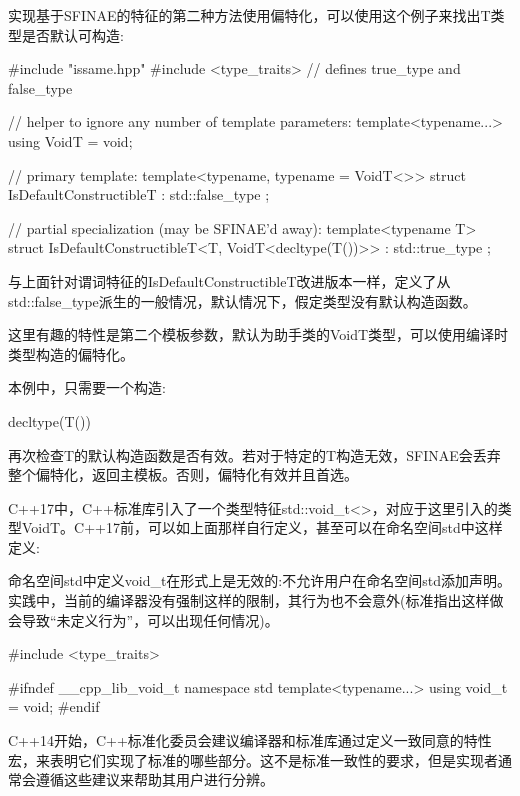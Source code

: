 实现基于SFINAE的特征的第二种方法使用偏特化，可以使用这个例子来找出T类型是否默认可构造:

\begin{cpp}
#include "issame.hpp"
#include <type_traits> // defines true_type and false_type

// helper to ignore any number of template parameters:
template<typename...> using VoidT = void;

// primary template:
template<typename, typename = VoidT<>>
struct IsDefaultConstructibleT : std::false_type
{
};

// partial specialization (may be SFINAE’d away):
template<typename T>
struct IsDefaultConstructibleT<T, VoidT<decltype(T())>> : std::true_type
{
};
\end{cpp}

与上面针对谓词特征的IsDefaultConstructibleT改进版本一样，定义了从std::false\_type派生的一般情况，默认情况下，假定类型没有默认构造函数。

这里有趣的特性是第二个模板参数，默认为助手类的VoidT类型，可以使用编译时类型构造的偏特化。

本例中，只需要一个构造:

\begin{cpp}
decltype(T())
\end{cpp}

再次检查T的默认构造函数是否有效。若对于特定的T构造无效，SFINAE会丢弃整个偏特化，返回主模板。否则，偏特化有效并且首选。

C++17中，C++标准库引入了一个类型特征std::void\_t<>，对应于这里引入的类型VoidT。C++17前，可以如上面那样自行定义，甚至可以在命名空间std中这样定义:

\begin{notice}
命名空间std中定义void\_t在形式上是无效的:不允许用户在命名空间std添加声明。实践中，当前的编译器没有强制这样的限制，其行为也不会意外(标准指出这样做会导致“未定义行为”，可以出现任何情况)。
\end{notice}

\begin{cpp}
#include <type_traits>

#ifndef __cpp_lib_void_t
namespace std {
	template<typename...> using void_t = void;
}
#endif
\end{cpp}

C++14开始，C++标准化委员会建议编译器和标准库通过定义一致同意的特性宏，来表明它们实现了标准的哪些部分。这不是标准一致性的要求，但是实现者通常会遵循这些建议来帮助其用户进行分辨。

